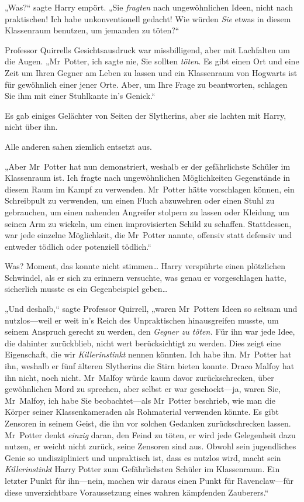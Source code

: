 {„Was?“ sagte Harry empört. „Sie \emph{fragten} nach ungewöhnlichen Ideen, nicht nach praktischen! Ich habe unkonventionell gedacht! Wie würden \emph{Sie} etwas in diesem Klassenraum benutzen, um jemanden zu töten?“

Professor Quirrells Gesichtsausdruck war missbilligend, aber mit Lachfalten um die Augen. „Mr~Potter, ich sagte nie, Sie sollten \emph{töten}. Es gibt einen Ort und eine Zeit um Ihren Gegner am Leben zu lassen und ein Klassenraum von Hogwarts ist für gewöhnlich einer jener Orte. Aber, um Ihre Frage zu beantworten, schlagen Sie ihm mit einer Stuhlkante in's Genick.“

Es gab einiges Gelächter von Seiten der Slytherins, aber sie lachten mit Harry, nicht über ihn.

Alle anderen sahen ziemlich entsetzt aus.

„Aber Mr~Potter hat nun demonstriert, weshalb er der gefährlichste Schüler im Klassenraum ist. Ich fragte nach ungewöhnlichen Möglichkeiten Gegenstände in diesem Raum im Kampf zu verwenden. Mr~Potter hätte vorschlagen können, ein Schreibpult zu verwenden, um einen Fluch abzuwehren oder einen Stuhl zu gebrauchen, um einen nahenden Angreifer stolpern zu lassen oder Kleidung um seinen Arm zu wickeln, um einen improvisierten Schild zu schaffen. Stattdessen, war jede einzelne Möglichkeit, die Mr~Potter nannte, offensiv statt defensiv und entweder tödlich oder potenziell tödlich.“

Was? Moment, das konnte nicht stimmen… Harry verspührte einen plötzlichen Schwindel, als er sich zu erinnern versuchte, was genau er vorgeschlagen hatte, sicherlich musste es ein Gegenbeispiel geben…

„Und deshalb,“ sagte Professor Quirrell, „waren Mr~Potters Ideen so seltsam und nutzlos—weil er weit in's Reich des Unpraktischen hinausgreifen musste, um seinem Anspruch gerecht zu werden, den \emph{Gegner zu töten.} Für ihn war jede Idee, die dahinter zurückblieb, nicht wert berücksichtigt zu werden. Dies zeigt eine Eigenschaft, die wir \emph{Killerinstinkt} nennen könnten. Ich habe ihn. Mr~Potter hat ihn, weshalb er fünf älteren Slytherins die Stirn bieten konnte. Draco Malfoy hat ihn nicht, noch nicht. Mr~Malfoy würde kaum davor zurückschrecken, über gewöhnlichen Mord zu sprechen, aber selbst er war geschockt—ja, waren Sie, Mr~Malfoy, ich habe Sie beobachtet—als Mr~Potter beschrieb, wie man die Körper seiner Klassenkameraden als Rohmaterial verwenden könnte. Es gibt Zensoren in seinem Geist, die ihn vor solchen Gedanken zurückschrecken lassen. Mr~Potter denkt \emph{einzig} daran, den Feind zu töten, er wird jede Gelegenheit dazu nutzen, er weicht nicht zurück, seine Zensoren sind aus. Obwohl sein jugendliches Genie so undiszipliniert und unpraktisch ist, dass es nutzlos wird, macht sein \emph{Killerinstinkt} Harry Potter zum Gefährlichsten Schüler im Klassenraum. Ein letzter Punkt für ihn—nein, machen wir daraus einen Punkt für Ravenclaw—für diese unverzichtbare Voraussetzung eines wahren kämpfenden Zauberers.“

}
